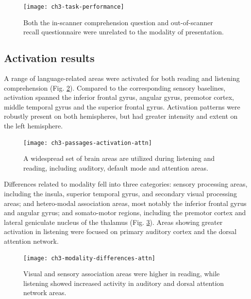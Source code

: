 \begin{figure}[t]
	\centering
	\texttt{[image: ch3-task-performance]}
    \caption[Behavioral metrics of passage performance were unrelated to modality.]{Both the in-scanner comprehension question and out-of-scanner recall questionnaire were unrelated to the modality of presentation.}
	\label{fig:ch3-task-performance}
\end{figure}

\subsection{Activation results}

A range of language-related areas were activated for both reading and listening comprehension (Fig. \ref{fig:ch3-passages-activation-attn}). Compared to the corresponding sensory baselines, activation spanned the inferior frontal gyrus, angular gyrus, premotor cortex, middle temporal gyrus and the superior frontal gyrus. Activation patterns were robustly present on both hemispheres, but had greater intensity and extent on the left hemisphere. 

\begin{figure}[t]
	\centering
	\texttt{[image: ch3-passages-activation-attn]}
    \caption[There is significant overlap between the areas used in listening and reading.]{A widespread set of brain areas are utilized during listening and reading, including auditory, default mode and attention areas.}
	\label{fig:ch3-passages-activation-attn}
\end{figure}

Differences related to modality fell into three categories: sensory processing areas, including the insula, superior temporal gyrus, and secondary visual processing areas; and hetero-modal association areas, most notably the inferior frontal gyrus and angular gyrus; and somato-motor regions, including the premotor cortex and lateral geniculate nucleus of the thalamus (Fig. \ref{fig:ch3-modality-differences-attn}). Areas showing greater activation in listening were focused on primary auditory cortex and the dorsal attention network.

\begin{figure}[t]
	\centering
	\texttt{[image: ch3-modality-differences-attn]}
    \caption[Modality differences center on primary sensory and integration areas.]{Visual and sensory association areas were higher in reading, while listening showed increased activity in auditory and dorsal attention network areas.}
	\label{fig:ch3-modality-differences-attn}
\end{figure}

